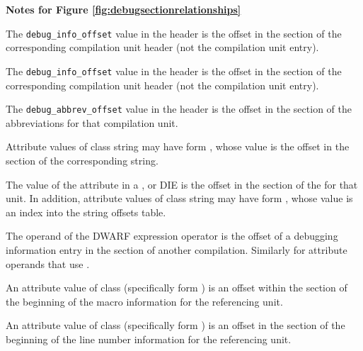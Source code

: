 \clearpage
\begin{center}
   \textbf{Notes for Figure \ref{fig:debugsectionrelationships}}
\end{center}
\begin{description} 
The \texttt{debug\_info\_offset} value in
the header is
the offset in the \dotdebuginfo{} section of the
corresponding compilation unit header (not the compilation
unit entry).

The \texttt{debug\_info\_offset} value in the header is the offset in the
\dotdebuginfo{} section of the 
corresponding compilation unit header (not
the compilation unit entry). 

The \texttt{debug\_abbrev\_offset} value in the header is the offset in the
\dotdebugabbrev{} 
section of the abbreviations for that compilation unit.

Attribute values of class string may have form 
\DWFORMstrp, whose
value is the offset in the \dotdebugstr{}
section of the corresponding string.

The value of the \DWATstroffsetsbase{} attribute in a
\DWTAGcompileunit{}, \DWTAGtypeunit{} or \DWTAGpartialunit{} 
DIE is the offset in the
\dotdebugstroffsets{} section of the 
for that unit.
In addition, attribute values of class string may have form 
\DWFORMstrx, whose value is an index into the
string offsets table.

The operand of the \DWOPcallref{} 
DWARF expression operator is the
offset of a debugging information entry in the 
\dotdebuginfo{} section of another compilation.
Similarly for attribute operands that use
\DWFORMrefaddr.

An attribute value of class 
 (specifically form
\DWFORMsecoffset) is an 
offset within the 
\dotdebugmacro{} section
of the beginning of the macro information for the referencing unit.

An attribute value of class 
 (specifically form
\DWFORMsecoffset) 
is an offset in the 
\dotdebugline{} section of the
beginning of the line number information for the referencing unit.


\end{description}
